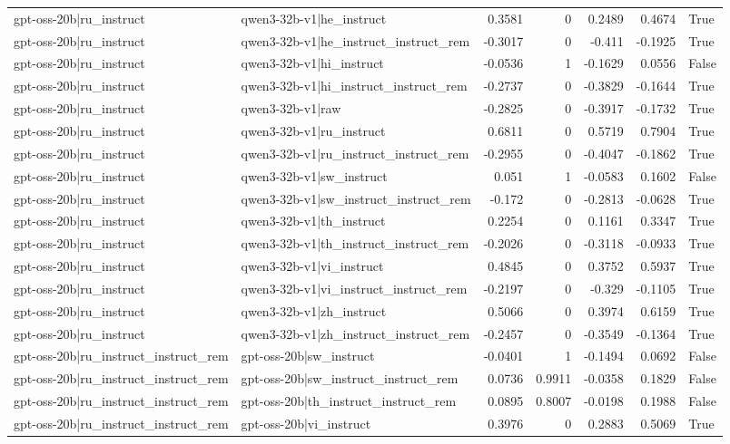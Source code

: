 \begin{table}
\begin{tabular}{l l r r r r l}
gpt-oss-20b|ru_instruct & qwen3-32b-v1|he_instruct & 0.3581 & 0 & 0.2489 & 0.4674 & True \\
gpt-oss-20b|ru_instruct & qwen3-32b-v1|he_instruct_instruct_rem & -0.3017 & 0 & -0.411 & -0.1925 & True \\
gpt-oss-20b|ru_instruct & qwen3-32b-v1|hi_instruct & -0.0536 & 1 & -0.1629 & 0.0556 & False \\
gpt-oss-20b|ru_instruct & qwen3-32b-v1|hi_instruct_instruct_rem & -0.2737 & 0 & -0.3829 & -0.1644 & True \\
gpt-oss-20b|ru_instruct & qwen3-32b-v1|raw & -0.2825 & 0 & -0.3917 & -0.1732 & True \\
gpt-oss-20b|ru_instruct & qwen3-32b-v1|ru_instruct & 0.6811 & 0 & 0.5719 & 0.7904 & True \\
gpt-oss-20b|ru_instruct & qwen3-32b-v1|ru_instruct_instruct_rem & -0.2955 & 0 & -0.4047 & -0.1862 & True \\
gpt-oss-20b|ru_instruct & qwen3-32b-v1|sw_instruct & 0.051 & 1 & -0.0583 & 0.1602 & False \\
gpt-oss-20b|ru_instruct & qwen3-32b-v1|sw_instruct_instruct_rem & -0.172 & 0 & -0.2813 & -0.0628 & True \\
gpt-oss-20b|ru_instruct & qwen3-32b-v1|th_instruct & 0.2254 & 0 & 0.1161 & 0.3347 & True \\
gpt-oss-20b|ru_instruct & qwen3-32b-v1|th_instruct_instruct_rem & -0.2026 & 0 & -0.3118 & -0.0933 & True \\
gpt-oss-20b|ru_instruct & qwen3-32b-v1|vi_instruct & 0.4845 & 0 & 0.3752 & 0.5937 & True \\
gpt-oss-20b|ru_instruct & qwen3-32b-v1|vi_instruct_instruct_rem & -0.2197 & 0 & -0.329 & -0.1105 & True \\
gpt-oss-20b|ru_instruct & qwen3-32b-v1|zh_instruct & 0.5066 & 0 & 0.3974 & 0.6159 & True \\
gpt-oss-20b|ru_instruct & qwen3-32b-v1|zh_instruct_instruct_rem & -0.2457 & 0 & -0.3549 & -0.1364 & True \\
gpt-oss-20b|ru_instruct_instruct_rem & gpt-oss-20b|sw_instruct & -0.0401 & 1 & -0.1494 & 0.0692 & False \\
gpt-oss-20b|ru_instruct_instruct_rem & gpt-oss-20b|sw_instruct_instruct_rem & 0.0736 & 0.9911 & -0.0358 & 0.1829 & False \\
gpt-oss-20b|ru_instruct_instruct_rem & gpt-oss-20b|th_instruct_instruct_rem & 0.0895 & 0.8007 & -0.0198 & 0.1988 & False \\
gpt-oss-20b|ru_instruct_instruct_rem & gpt-oss-20b|vi_instruct & 0.3976 & 0 & 0.2883 & 0.5069 & True \\

\end{tabular}
\end{table}

